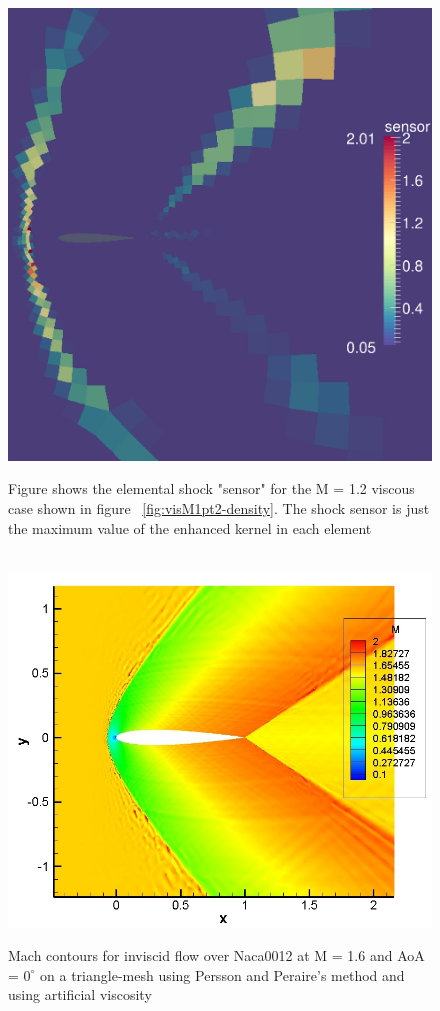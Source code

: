 \begin{figure}[h] \tt
\centering
\includegraphics[angle=0, scale = 0.55]{./figures/sensor-t1050010-spectral} \\
\caption{Figure shows the elemental shock "sensor" for the M = 1.2 viscous case shown in figure ~\ref{fig:visM1pt2-density}. The shock sensor is just the maximum value of the enhanced kernel in each element}
\label{fig:sensor}
\end{figure}

\begin{figure}[h] \tt
\centering
\includegraphics[angle=0, scale = 0.68]{./figures/M1pt6order3-inv-720ktime-mach.jpg} \\
\caption{Mach contours for inviscid flow over Naca0012 at M = 1.6 and AoA = $0^{\circ} $ on a triangle-mesh using Persson and Peraire's method and using artificial viscosity}
\label{fig:inv_mach}
\end{figure}

